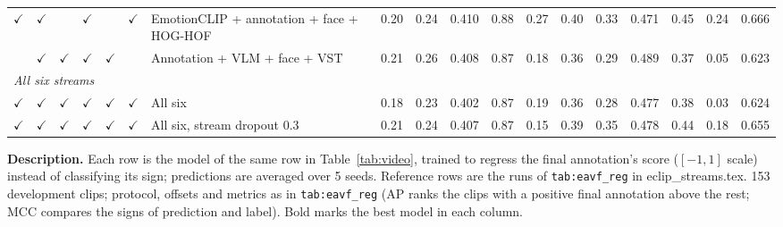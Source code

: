 \documentclass[11pt]{article}
\newcommand{\code}[1]{\texttt{#1}}
\newcommand{\tabledesc}[1]{\par\medskip\begin{minipage}{\linewidth}\footnotesize\textbf{Description.} #1\end{minipage}}
\begin{document}
\begin{table}[!htbp]
{\begin{tabular}{cccccclccccccccccc}
$\checkmark$ & $\checkmark$ &  & $\checkmark$ &  & $\checkmark$ & EmotionCLIP + annotation + face + HOG-HOF & 0.20 & 0.24 & 0.410 & 0.88 & 0.27 & 0.40 & 0.33 & 0.471 & 0.45 & 0.24 & 0.666 \\
 & $\checkmark$ & $\checkmark$ & $\checkmark$ & $\checkmark$ &  & Annotation + VLM + face + VST & 0.21 & 0.26 & 0.408 & 0.87 & 0.18 & 0.36 & 0.29 & 0.489 & 0.37 & 0.05 & 0.623 \\
\midrule
\multicolumn{18}{l}{\emph{All six streams}} \\
$\checkmark$ & $\checkmark$ & $\checkmark$ & $\checkmark$ & $\checkmark$ & $\checkmark$ & All six & 0.18 & 0.23 & 0.402 & 0.87 & 0.19 & 0.36 & 0.28 & 0.477 & 0.38 & 0.03 & 0.624 \\
$\checkmark$ & $\checkmark$ & $\checkmark$ & $\checkmark$ & $\checkmark$ & $\checkmark$ & All six, stream dropout 0.3 & 0.21 & 0.24 & 0.407 & 0.87 & 0.15 & 0.39 & 0.35 & 0.478 & 0.44 & 0.18 & 0.655 \\
\bottomrule
\end{tabular}%
}
\tabledesc{Each row is the model of the same row in Table~\ref{tab:video}, trained to regress the final annotation's score ($[-1, 1]$ scale) instead of classifying its sign; predictions are averaged over 5 seeds. Reference rows are the runs of \code{tab:eavf\_reg} in eclip\_streams.tex. 153 development clips; protocol, offsets and metrics as in \code{tab:eavf\_reg} (AP ranks the clips with a positive final annotation above the rest; MCC compares the signs of prediction and label). Bold marks the best model in each column.}
\end{table}
\end{document}

